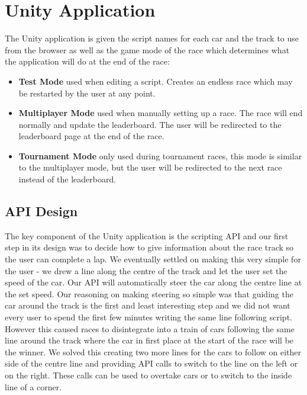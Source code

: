 \section{Unity Application}
The Unity application is given the script names for each car and the track to use from the browser as well as the game mode of the race which determines what the application will do at the end of the race:
\begin{itemize}
  \item \textbf{Test Mode} used when editing a script. Creates an endless race which may be restarted by the user at any point.
  \item \textbf{Multiplayer Mode} used when manually setting up a race. The race will end normally and update the leaderboard. The user will be redirected to the leaderboard page at the end of the race.
  \item \textbf{Tournament Mode} only used during tournament races, this mode is similar to the multiplayer mode, but the user will be redirected to the next race instead of the leaderboard.
\end{itemize}




\subsection{API Design}
The key component of the Unity application is the scripting API and our first step in its design was to decide how to give information about the race track so the user can complete a lap. We eventually settled on making this very simple for the user - we drew a line along the centre of the track and let the user set the speed of the car. Our API will automatically steer the car along the centre line at the set speed. Our reasoning on making steering so simple was that guiding the car around the track is the first and least interesting step and we did not want every user to spend the first few minutes writing the same line following script. However this caused races to disintegrate into a train of cars following the same line around the track where the car in first place at the start of the race will be the winner. We solved this creating two more lines for the cars to follow on either side of the centre line and providing API calls to switch to the line on the left or on the right. These calls can be used to overtake cars or to switch to the inside line of a corner.

